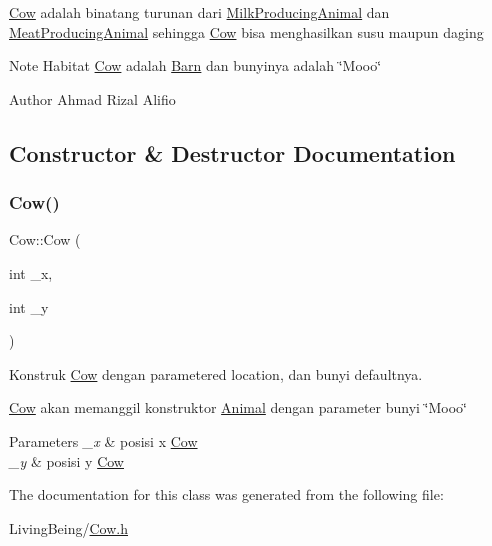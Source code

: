 \mbox{\hyperlink{classCow}{Cow}} adalah binatang turunan dari \mbox{\hyperlink{classMilkProducingAnimal}{Milk\+Producing\+Animal}} dan \mbox{\hyperlink{classMeatProducingAnimal}{Meat\+Producing\+Animal}} sehingga \mbox{\hyperlink{classCow}{Cow}} bisa menghasilkan susu maupun daging

\begin{DoxyNote}{Note}
Habitat \mbox{\hyperlink{classCow}{Cow}} adalah \mbox{\hyperlink{classBarn}{Barn}} dan bunyinya adalah \char`\"{}\+Mooo\char`\"{}
\end{DoxyNote}
\begin{DoxyAuthor}{Author}
Ahmad Rizal Alifio 
\end{DoxyAuthor}


\subsection{Constructor \& Destructor Documentation}
\mbox{\label{classCow_a8d004e3d53acceb83ac4321f972fc78b}} 
\subsubsection{\texorpdfstring{Cow()}{Cow()}}
{\footnotesize\ttfamily Cow\+::\+Cow (\begin{DoxyParamCaption}\item[{int}]{\+\_\+x,  }\item[{int}]{\+\_\+y }\end{DoxyParamCaption})}



Konstruk \mbox{\hyperlink{classCow}{Cow}} dengan parametered location, dan bunyi defaultnya. 

\mbox{\hyperlink{classCow}{Cow}} akan memanggil konstruktor \mbox{\hyperlink{classAnimal}{Animal}} dengan parameter bunyi \char`\"{}\+Mooo\char`\"{}


\begin{DoxyParams}{Parameters}
{\em \+\_\+x} & posisi x \mbox{\hyperlink{classCow}{Cow}} \\
\hline
{\em \+\_\+y} & posisi y \mbox{\hyperlink{classCow}{Cow}} \\
\hline
\end{DoxyParams}


The documentation for this class was generated from the following file\+:\begin{DoxyCompactItemize}
\item 
Living\+Being/\mbox{\hyperlink{Cow_8h}{Cow.\+h}}\end{DoxyCompactItemize}
